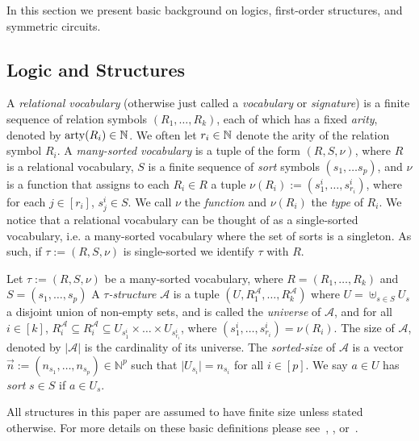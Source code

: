 \documentclass[../paper.tex]{subfiles}
\begin{document}
In this section we present basic background on logics, first-order structures,
and symmetric circuits.

\subsection{Logic and Structures}
A \emph{relational vocabulary} (otherwise just called a \emph{vocabulary} or
\emph{signature}) is a finite sequence of relation symbols $(R_1, \ldots, R_k)$,
each of which has a fixed \emph{arity}, denoted by $\mathrm{arty}(R_i) \in \mathbb{N}$. We
often let $r_i \in \mathbb{N}$ denote the arity of the relation symbol $R_i$. A
\emph{many-sorted vocabulary} is a tuple of the form $(R, S, \nu)$, where $R$ is
a relational vocabulary, $S$ is a finite sequence of \emph{sort} symbols $(s_1,
\ldots s_p)$, and $\nu$ is a function that assigns to each $R_i \in R$ a tuple
$\nu(R_i) := (s^i_1, \ldots, s^i_{r_i})$, where for each $j \in [r_i]$, $s^i_j
\in S$. We call $\nu$ the \emph{\type function} and $\nu(R_i)$ the \emph{type}
of $R_i$. We notice that a relational vocabulary can be thought of as a
single-sorted vocabulary, i.e. a many-sorted vocabulary where the set of sorts
is a singleton. As such, if $\tau := (R, S, \nu)$ is single-sorted we identify
$\tau$ with $R$.

Let $\tau := (R, S, \nu)$ be a many-sorted vocabulary, where $R = (R_1, \ldots,
R_k)$ and $S = (s_1, \ldots , s_p)$ A \emph{$\tau$-structure} $\mathcal{A}$ is a
tuple $(U , R^{\mathcal{A}}_1 , \ldots , R^{\mathcal{A}}_k)$ where $U =
\uplus_{s \in S } U_{s}$ a disjoint union of non-empty sets, and is called the
\emph{universe} of $\mathcal{A}$, and for all $i \in [k]$, $R^{\mathcal{A}}_i
\subseteq R^{\mathcal{A}}_i \subseteq U_{s^i_1} \times \ldots \times
U_{s^i_{r_i}}$, where $(s^i_1 , \ldots , s^i_{r_i}) = \nu (R_i)$. The size of
$\mathcal{A}$, denoted by $\vert \mathcal{A} \vert$ is the cardinality of its
universe. The \emph{sorted-size} of $\mathcal{A}$ is a vector $\vec{n} :=
(n_{s_1}, \ldots , n_{s_p}) \in \mathbb{N}^{p}$ such that $\vert U_{s_i} \vert =
n_{s_i}$ for all $i \in [p]$. We say $a \in U$ has \emph{sort} $s \in S$ if $a
\in U_s$.

All structures in this paper are assumed to have finite size unless stated
otherwise. For more details on these basic definitions please
see~\cite{Gradel:2005}, \cite{immerman1999descriptive},
or~\cite{grohe2017descriptive}.

\end{document}
